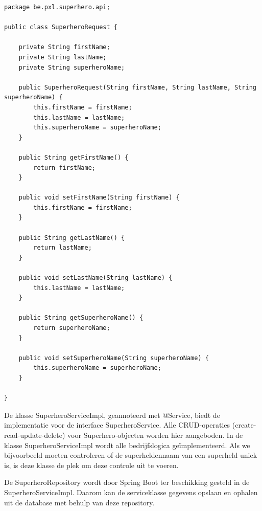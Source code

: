 \begin{lstlisting}[frame=single]
package be.pxl.superhero.api;

public class SuperheroRequest {

	private String firstName;
	private String lastName;
	private String superheroName;

	public SuperheroRequest(String firstName, String lastName, String superheroName) {
		this.firstName = firstName;
		this.lastName = lastName;
		this.superheroName = superheroName;
	}

	public String getFirstName() {
		return firstName;
	}

	public void setFirstName(String firstName) {
		this.firstName = firstName;
	}

	public String getLastName() {
		return lastName;
	}

	public void setLastName(String lastName) {
		this.lastName = lastName;
	}

	public String getSuperheroName() {
		return superheroName;
	}

	public void setSuperheroName(String superheroName) {
		this.superheroName = superheroName;
	}

}

\end{lstlisting}

De klasse SuperheroServiceImpl, geannoteerd met @Service, biedt de implementatie voor de interface SuperheroService.
Alle CRUD-operaties (create-read-update-delete) voor Superhero-objecten worden hier aangeboden.
In de klasse SuperheroServiceImpl wordt alle bedrijfslogica geïmplementeerd. Als we bijvoorbeeld moeten controleren of de superheldennaam van een superheld uniek is, is deze klasse de plek om deze controle uit te voeren. 

De SuperheroRepository wordt door Spring Boot ter beschikking gesteld in de SuperheroServiceImpl. Daarom kan de serviceklasse gegevens opslaan en ophalen uit de database met behulp van deze repository.


